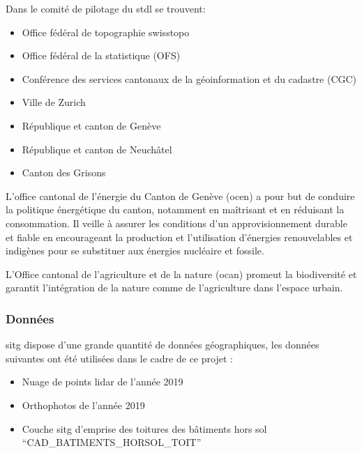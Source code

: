 Dans le comité de pilotage du \acrshort{stdl} se trouvent:
\begin{itemize}
    \item Office fédéral de topographie swisstopo
    \item Office fédéral de la statistique (OFS)
    \item Conférence des services cantonaux de la géoinformation et du cadastre (CGC)
    \item Ville de Zurich
    \item République et canton de Genève
    \item République et canton de Neuchâtel
    \item Canton des Grisons
\end{itemize}

\par{L'office cantonal de l'énergie du Canton de Genève (\acrshort{ocen}) a pour but de conduire la politique énergétique du canton, notamment en maîtrisant et en réduisant la consommation. Il veille à assurer les conditions d'un approvisionnement durable et fiable en encourageant la production et l'utilisation d'énergies renouvelables et indigènes pour se substituer aux énergies nucléaire et fossile. \cite{etat_de_geneve_office_nodate-1}}

\par{L'Office cantonal de l'agriculture et de la nature (\acrshort{ocan}) promeut la biodiversité et garantit l'intégration de la nature comme de l'agriculture dans l'espace urbain. \cite{etat_de_geneve_office_nodate}}

\subsubsection{Données}

\par{\acrshort{sitg} dispose d'une grande quantité de données géographiques, les données suivantes ont été utilisées dans le cadre de ce projet :}
\begin{itemize}
    \item Nuage de points \gls{lidar} de l'année 2019 \cite{sitg_nuages_2019}
    \item Orthophotos de l'année 2019 \cite{sitg_orthophotos_nodate}
    \item Couche \acrshort{sitg} d'emprise des toitures des bâtiments hors sol ``CAD\_BATIMENTS\_HORSOL\_TOIT'' \cite{sitg_toits_nodate}
\end{itemize}

